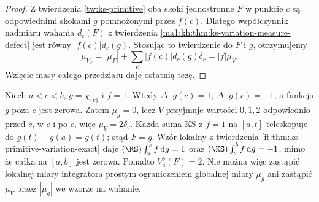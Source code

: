 \begin{proof}
Z twierdzenia \ref{tw:ks-primitive} oba skoki jednostronne
$F$ w punkcie $c$ są odpowiednimi skokami $g$
pomnożonymi przez $f(c)$. Dlatego współczynnik nadmiaru
wahania $d_c(F)$ z twierdzenia
\ref{ma1:kh:thm:ks-variation-measure-defect} jest równy
$|f(c)|d_c(g)$. Stosując to twierdzenie do $F$ i $g$,
otrzymujemy
\[
 \mu_{V_F}=|\mu_F|+\sum_c |f(c)|d_c(g)\delta_c
 =|f|\mu_V .
\]
Wzięcie masy całego przedziału daje ostatnią tezę.
\end{proof}

\begin{przyklad}
\label{it:ex:ks-local-cancelled-atom}
Niech $a<c<b$, $g=\chi_{\{c\}}$ i $f=1$.
Wtedy $\Delta^-g(c)=1$, $\Delta^+g(c)=-1$,
a funkcja $g$ poza $c$ jest zerowa. Zatem $\mu_g=0$,
lecz $V$ przyjmuje wartości $0,1,2$ odpowiednio przed
$c$, w $c$ i po $c$, więc $\mu_V=2\delta_c$.
Każda suma KS z $f=1$ na $[a,t]$ teleskopuje do
$g(t)-g(a)=g(t)$; stąd $F=g$.
Wzór lokalny z twierdzenia \ref{it:thm:ks-primitive-variation-exact}
daje $(\KS)\int_a^c f\,\mathrm dg=1$ oraz
$(\KS)\int_c^b f\,\mathrm dg=-1$, mimo że całka na
$[a,b]$ jest zerowa. Ponadto $V_a^b(F)=2$.
Nie można więc zastąpić lokalnej miary integratora
prostym ograniczeniem globalnej miary $\mu_g$
ani zastąpić $\mu_V$ przez $|\mu_g|$ we wzorze na wahanie.
\end{przyklad}

